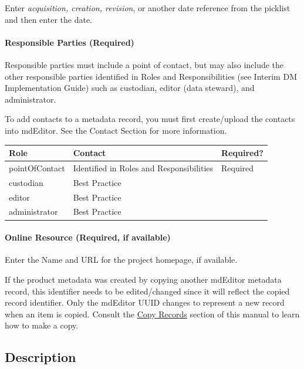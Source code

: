 \documentclass[
]{book}
\makeatletter
\let\oldparagraph\paragraph
\renewcommand{\paragraph}[1]{\oldparagraph{#1}\mbox{}}
\newenvironment{kframe}{%
\medskip{}
\setlength{\fboxsep}{.8em}
 \def\at@end@of@kframe{}%
 \ifinner\ifhmode%
  \def\at@end@of@kframe{\end{minipage}}%
  \begin{minipage}{\columnwidth}%
 \fi\fi%
 \def\FrameCommand##1{\hskip\@totalleftmargin \hskip-\fboxsep
 \colorbox{shadecolor}{##1}\hskip-\fboxsep
     \hskip-\linewidth \hskip-\@totalleftmargin \hskip\columnwidth}%
 \MakeFramed {\advance\hsize-\width
   \@totalleftmargin\z@ \linewidth\hsize
   \@setminipage}}%
 {\par\unskip\endMakeFramed%
 \at@end@of@kframe}
\newenvironment{rmdblock}[1]
  {
  \begin{itemize}
  \renewcommand{\labelitemi}{
    \raisebox{-.7\height}[0pt][0pt]{
      {\setkeys{Gin}{width=3em,keepaspectratio}\texttt{[image: images/\#1]}}
    }
  }
  \setlength{\fboxsep}{1em}
  \begin{kframe}
  \item
  }
  {
  \end{kframe}
  \end{itemize}
  }
\newenvironment{rmdcaution}
  {\begin{rmdblock}{caution}}
  {\end{rmdblock}}
\newenvironment{rmdtip}
  {\begin{rmdblock}{tip}}
  {\end{rmdblock}}
\makeatother
\begin{document}
Enter \emph{acquisition, creation, revision}, or another date reference from the picklist and then enter the date.

\hypertarget{responsible-parties-required-1}{%
\paragraph{Responsible Parties (Required)}\label{responsible-parties-required-1}}

Responsible parties must include a point of contact, but may also include the other responsible parties identified in Roles and Responsibilities (see Interim DM Implementation Guide) such as custodian, editor (data steward), and administrator.

\begin{rmdtip}
To add contacts to a metadata record, you must first create/upload the
contacts into mdEditor. See the Contact Section for more information.
\end{rmdtip}

\begin{longtable}[]{@{}lll@{}}
\toprule
Role & Contact & Required?\tabularnewline
\midrule
\endhead
pointOfContact & Identified in Roles and Responsibilities & Required\tabularnewline
custodian & Best Practice &\tabularnewline
editor & Best Practice &\tabularnewline
administrator & Best Practice &\tabularnewline
\bottomrule
\end{longtable}

\hypertarget{online-resource-required-if-available}{%
\paragraph{Online Resource (Required, if available)}\label{online-resource-required-if-available}}

Enter the Name and URL for the project homepage, if available.

\begin{rmdcaution}
If the product metadata was created by copying another mdEditor metadata
record, this identifier needs to be edited/changed since it will reflect
the copied record identifier. Only the mdEditor UUID changes to
represent a new record when an item is copied. Consult the
\protect\hyperlink{copy-records}{Copy Records} section of this manual to
learn how to make a copy.
\end{rmdcaution}

\hypertarget{description-1}{%
\subsection{Description}\label{description-1}}
\end{document}
